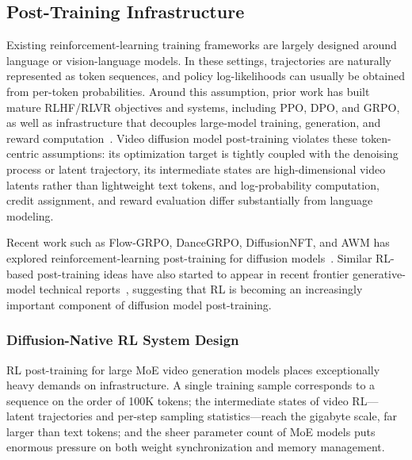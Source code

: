 \subsection{Post-Training Infrastructure}
Existing reinforcement-learning training frameworks are largely designed around language or vision-language models.
In these settings, trajectories are naturally represented as token sequences, and policy log-likelihoods can usually be obtained from per-token probabilities.
Around this assumption, prior work has built mature RLHF/RLVR objectives and systems, including PPO, DPO, and GRPO, as well as infrastructure that decouples large-model training, generation, and reward computation~\cite{
    schulman2017ppo,
    rafailov2023dpo,
    shao2024deepseekmath,
    sheng2024hybridflow,
    hu2024openrlhf,
    mei2024realhf,
    slime2025,
    zhang2026relax}.
Video diffusion model post-training violates these token-centric assumptions: its optimization target is tightly coupled with the denoising process or latent trajectory, its intermediate states are high-dimensional video latents rather than lightweight text tokens, and log-probability computation, credit assignment, and reward evaluation differ substantially from language modeling.

\noindent Recent work such as Flow-GRPO, DanceGRPO, DiffusionNFT, and AWM has explored reinforcement-learning post-training for diffusion models~\cite{
    liu2025flowgrpo,
    xue2025dancegrpo,
    zheng2026diffusionnft,
    xue2025awm}.
Similar RL-based post-training ideas have also started to appear in recent frontier generative-model technical reports~\cite{
    hunyuanvideo15,
    longcatvideo}, suggesting that RL is becoming an increasingly important component of diffusion model post-training.

\subsubsection{Diffusion-Native RL System Design}
RL post-training for large MoE video generation models places exceptionally heavy demands on infrastructure.
A single training sample corresponds to a sequence on the order of 100K tokens; the intermediate states of video RL---latent trajectories and per-step sampling statistics---reach the gigabyte scale, far larger than text tokens; and the sheer parameter count of MoE models puts enormous pressure on both weight synchronization and memory management.

